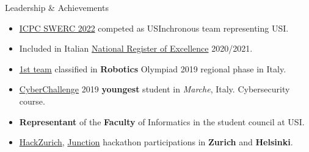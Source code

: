 \documentclass{cv} %
\begin{document}
\begin{minipage}[b][0.9\paperheight][t]{0.7\linewidth}
\begin{rSection}{Leadership \& Achievements}
\begin{itemize}[leftmargin=*]
    \item \href{https://icpc.global/ICPCID/ZOI3HF9XDUH8}{ICPC SWERC 2022}
        competed as USInchronous team representing USI.

    \item Included in Italian \href{https://www.indire.it/eccellenze/}{National Register of Excellence} 2020/2021.

    \item \href{https://www.makerslab.it/olimpiadi-robotiche-ancona-2019/}{1st team}
        classified in \textbf{Robotics} Olympiad 2019 regional phase in Italy. %

    \item \href{https://cyberchallenge.it/}{CyberChallenge} 2019 \textbf{youngest} student
        in \textit{Marche}, Italy. Cybersecurity course. %

    \item \textbf{Representant} of the \textbf{Faculty} of Informatics in the student council at USI.

    \item \href{https://hackzurich.com/}{HackZurich}, 
        \href{https://www.junction2023.com/}{Junction} 
        hackathon participations in \textbf{Zurich} and \textbf{Helsinki}.
    \end{itemize}
\end{rSection}

\end{minipage}
\end{document}
